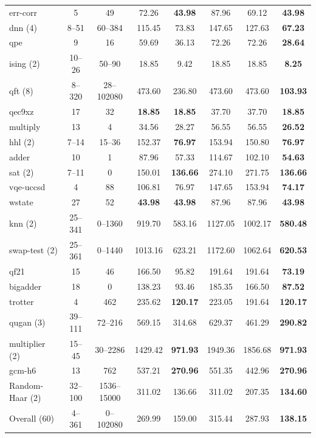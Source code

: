 \begin{table}[!tbp]
\begin{tabular*}{\textwidth}{@{}l@{\extracolsep{\fill}}*{7}{c}@{}}
err-corr & 5 & 49 & 72.26 & \textbf{43.98} & 87.96 & 69.12 & \textbf{43.98} \\
dnn (4) & 8--51 & 60--384 & 115.45 & 73.83 & 147.65 & 127.63 & \textbf{67.23} \\
qpe & 9 & 16 & 59.69 & 36.13 & 72.26 & 72.26 & \textbf{28.64} \\
ising (2) & 10--26 & 50--90 & 18.85 & 9.42 & 18.85 & 18.85 & \textbf{8.25} \\
qft (8) & 8--320 & 28--102080 & 473.60 & 236.80 & 473.60 & 473.60 & \textbf{103.93} \\
qec9xz & 17 & 32 & \textbf{18.85} & \textbf{18.85} & 37.70 & 37.70 & \textbf{18.85} \\
multiply & 13 & 4 & 34.56 & 28.27 & 56.55 & 56.55 & \textbf{26.52} \\
hhl (2) & 7--14 & 15--36 & 152.37 & \textbf{76.97} & 153.94 & 150.80 & \textbf{76.97} \\
adder & 10 & 1 & 87.96 & 57.33 & 114.67 & 102.10 & \textbf{54.63} \\
sat (2) & 7--11 & 0 & 150.01 & \textbf{136.66} & 274.10 & 271.75 & \textbf{136.66} \\
vqe-uccsd & 4 & 88 & 106.81 & 76.97 & 147.65 & 153.94 & \textbf{74.17} \\
wstate & 27 & 52 & \textbf{43.98} & \textbf{43.98} & 87.96 & 87.96 & \textbf{43.98} \\
knn (2) & 25--341 & 0--1360 & 919.70 & 583.16 & 1127.05 & 1002.17 & \textbf{580.48} \\
swap-test (2) & 25--361 & 0--1440 & 1013.16 & 623.21 & 1172.60 & 1062.64 & \textbf{620.53} \\
qf21 & 15 & 46 & 166.50 & 95.82 & 191.64 & 191.64 & \textbf{73.19} \\
bigadder & 18 & 0 & 138.23 & 93.46 & 185.35 & 166.50 & \textbf{87.52} \\
trotter & 4 & 462 & 235.62 & \textbf{120.17} & 223.05 & 191.64 & \textbf{120.17} \\
qugan (3) & 39--111 & 72--216 & 569.15 & 314.68 & 629.37 & 461.29 & \textbf{290.82} \\
multiplier (2) & 15--45 & 30--2286 & 1429.42 & \textbf{971.93} & 1949.36 & 1856.68 & \textbf{971.93} \\
gcm-h6 & 13 & 762 & 537.21 & \textbf{270.96} & 551.35 & 442.96 & \textbf{270.96} \\
Random-Haar (2) & 32--100 & 1536--15000 & 311.02 & 136.66 & 311.02 & 207.35 & \textbf{134.60} \\
\midrule
Overall (60) & 4--361 & 0--102080 & 269.99 & 159.00 & 315.44 & 287.93 & \textbf{138.15} \\
\bottomrule
\end{tabular*}\endgroup
\end{table}
